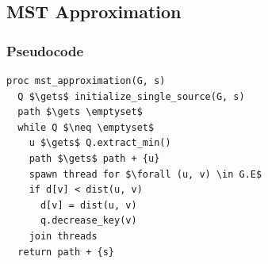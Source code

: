 \documentclass[a4paper,12pt]{article}
\begin{document}
\subsection{MST Approximation}
\subsubsection{Pseudocode}
\begin{lstlisting}[mathescape=true]
proc mst_approximation(G, s)
  Q $\gets$ initialize_single_source(G, s)
  path $\gets \emptyset$
  while Q $\neq \emptyset$
    u $\gets$ Q.extract_min()
    path $\gets$ path + {u}
    spawn thread for $\forall (u, v) \in G.E$
    if d[v] < dist(u, v)
      d[v] = dist(u, v)
      q.decrease_key(v)
    join threads
  return path + {s}
\end{lstlisting}
\end{document}
